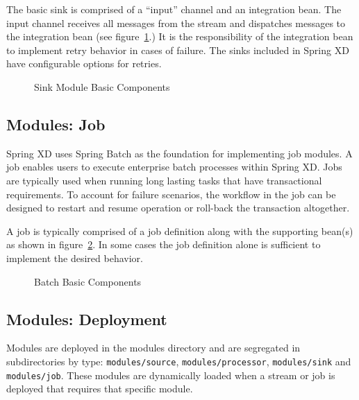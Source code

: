 \par

The basic sink is comprised of a ``input'' channel and an integration bean.
The input channel receives all messages from the stream and dispatches
messages to the integration bean (see figure~\ref{fig:sinkmbc}.) It is the responsibility 
of the integration bean to implement retry behavior in cases of failure. The sinks 
included in Spring XD have configurable options for retries.

\par

\begin{figure}
\centering
{}
\caption{Sink Module Basic Components}
\label{fig:sinkmbc}
\end{figure}

\par

\subsection{Modules: Job}
Spring XD uses Spring Batch \cite{spring-batch-reference} as the foundation for implementing
job modules. A job enables users to execute enterprise batch processes within Spring XD.
Jobs are typically used when running long lasting tasks that have transactional requirements.
To account for failure scenarios, the workflow in the job can be designed to restart and 
resume operation or roll-back the transaction altogether.

\par

A job is typically comprised of a job definition along with the supporting
bean(s) as shown in figure~\ref{fig:batchmbc}.
In some cases the job definition alone is sufficient to implement the desired behavior.

\par

\begin{figure}
\centering
{}
\caption{Batch Basic Components}
\label{fig:batchmbc}
\end{figure}

\par 

\subsection{Modules: Deployment}
Modules are deployed in the modules directory and are segregated in
subdirectories by type: \texttt{modules/source}, \texttt{modules/processor}, 
\texttt{modules/sink} and \texttt{modules/job}.
These modules are dynamically loaded when a stream or job is deployed that requires that
specific module.

